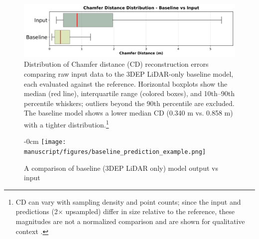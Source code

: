 \documentclass[remotesensing,article,submit,pdftex,moreauthors]{Definitions/mdpi}
\newenvironment{widefigure}[1][]{%
  \begin{figure}[#1]\begin{adjustwidth}{-\extralength}{0cm}\centering}{%
  \end{adjustwidth}\end{figure}}
\begin{document}
\begin{figure}[!b]
    \centering
    \includegraphics[width=0.9\linewidth]{manuscript/figures/baseline_v_input_boxplot.png}
    \caption{Distribution of Chamfer distance (CD) reconstruction errors comparing raw input data to the 3DEP LiDAR-only baseline model, each evaluated against the reference. Horizontal boxplots show the median (red line), interquartile range (colored boxes), and 10th–90th percentile whiskers; outliers beyond the 90th percentile are excluded. The baseline model shows a lower median CD (0.340 m vs. 0.858 m) with a tighter distribution.\footnote{CD can vary with sampling density and point counts; since the input and predictions (2$\times$ upsampled) differ in size relative to the reference, these magnitudes are not a normalized comparison and are shown for qualitative context \citep{wu2021dcd,lin2023hcd}.}}
    \label{fig:baseline_v_input_boxplot}
\end{figure}

\begin{widefigure}[!t]
    \vspace{-15pt}
    \centering
    \texttt{[image: manuscript/figures/baseline\_prediction\_example.png]}
    \caption{A comparison of baseline (3DEP LiDAR only) model output vs input}
    \label{fig:baseline_pt_cloud_example}
\end{widefigure}
\end{document}

